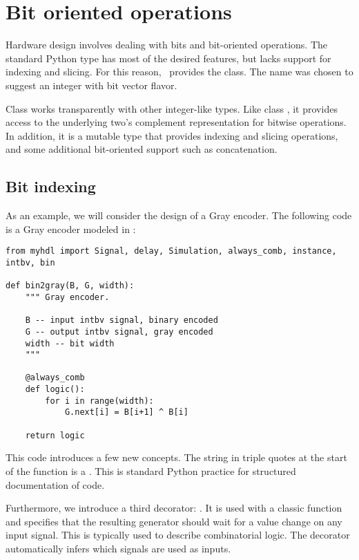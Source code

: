 \section{Bit oriented operations \label{intro-bit}}

Hardware design involves dealing with bits and bit-oriented
operations. The standard Python type  has most of the
desired features, but lacks support for indexing and slicing. For this
reason, \myhdl\ provides the  class. The name was chosen
to suggest an integer with bit vector flavor.

Class  works transparently with other
integer-like types. Like class , it provides access to the
underlying two's complement representation for bitwise
operations. In addition, it is a mutable type that provides indexing
and slicing operations, and some additional bit-oriented support such
as concatenation.

\subsection{Bit indexing \label{intro-indexing}}

As an example, we will consider the design of a Gray encoder. The
following code is a Gray encoder modeled in \myhdl{}:

\begin{verbatim}
from myhdl import Signal, delay, Simulation, always_comb, instance, intbv, bin

def bin2gray(B, G, width):
    """ Gray encoder.

    B -- input intbv signal, binary encoded
    G -- output intbv signal, gray encoded
    width -- bit width
    """
    
    @always_comb
    def logic():
        for i in range(width):
            G.next[i] = B[i+1] ^ B[i]
            
    return logic
\end{verbatim}

This code introduces a few new concepts. The string in triple quotes
at the start of the function is a . This is standard
Python practice for structured documentation of code.

Furthermore, we introduce a third decorator: .
It is used with a classic function and specifies that the 
resulting generator should
wait for a value change on any input signal. This is typically used to
describe 
combinatorial logic. The  decorator
automatically infers which signals are used as inputs.

